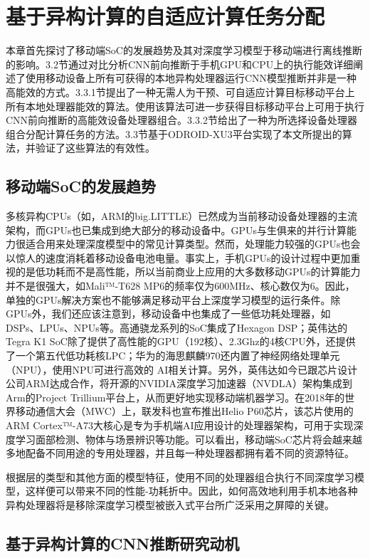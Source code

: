 \chapter{基于异构计算的自适应计算任务分配}

本章首先探讨了移动端SoC的发展趋势及其对深度学习模型于移动端进行离线推断的影响。3.2节通过对比分析CNN前向推断于手机GPU和CPU上的执行能效详细阐述了使用移动设备上所有可获得的本地异构处理器运行CNN模型推断并非是一种高能效的方式。3.3.1节提出了一种无需人为干预、可自适应计算目标移动平台上所有本地处理器能效的算法。使用该算法可进一步获得目标移动平台上可用于执行CNN前向推断的高能效设备处理器组合。3.3.2节给出了一种为所选择设备处理器组合分配计算任务的方法。3.3节基于ODROID-XU3平台实现了本文所提出的算法，并验证了这些算法的有效性。

\section{移动端SoC的发展趋势}
多核异构CPUs（如，ARM的big.LITTLE\cite{chung2012heterogeneous}）已然成为当前移动设备处理器的主流架构，而GPUs也已集成到绝大部分的移动设备中。GPUs与生俱来的并行计算能力很适合用来处理深度模型中的常见计算类型。然而，处理能力较强的GPUs也会以惊人的速度消耗着移动设备电池电量。事实上，手机GPUs的设计过程中更加重视的是低功耗而不是高性能，所以当前商业上应用的大多数移动GPUs的计算能力并不是很强大，如Mali™-T628 MP6的频率仅为600MHz、核心数仅为6。因此，单独的GPUs解决方案也不能够满足移动平台上深度学习模型的运行条件。除GPUs外，我们还应该注意到，移动设备中也集成了一些低功耗处理器，如DSPs、LPUs、NPUs等。高通骁龙系列的SoC集成了Hexagon DSP；英伟达的Tegra K1 SoC除了提供了高性能的GPU（192核）、2.3Ghz的4核CPU外，还提供了一个第五代低功耗核LPC；华为的海思麒麟970还内置了神经网络处理单元（NPU），使用NPU可进行高效的 AI相关计算。另外，英伟达如今已跟芯片设计公司ARM达成合作，将开源的NVIDIA深度学习加速器（NVDLA）架构集成到Arm的Project Trillium平台上，从而更好地实现移动端机器学习。在2018年的世界移动通信大会（MWC）上，联发科也宣布推出Helio P60芯片，该芯片使用的ARM Cortex™-A73大核心是专为手机端AI应用设计的处理器架构，可用于实现深度学习面部检测、物体与场景辨识等功能。可以看出，移动端SoC芯片将会越来越多地配备不同用途的专用处理器，并且每一种处理器都拥有着不同的资源特征。

根据层的类型和其他方面的模型特征，使用不同的处理器组合执行不同深度学习模型，这样便可以带来不同的性能-功耗折中。因此，如何高效地利用手机本地各种异构处理器将是移除深度学习模型被嵌入式平台所广泛采用之屏障的关键\cite{attia2015dynamic}。

\section{基于异构计算的CNN推断研究动机}

